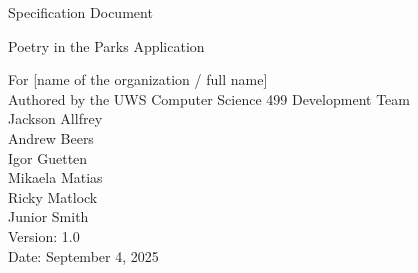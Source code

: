 \documentclass[reqno]{article}
\numberwithin{equation}{section}
\numberwithin{figure}{section}
\begin{document}
\begin{titlepage}
   \begin{center}
       \vspace*{1cm}
        Specification Document\\
        \vspace{0.50cm}
        
        Poetry in the Parks Application\\
        \vspace{0.50cm}
        
        For [name of the organization / full name]\\
        
        \vspace{0.50cm}
        Authored by the UWS Computer Science 499 Development Team \\
        
        \vspace{1.50cm}
        Jackson Allfrey\\ 
        \vspace{0.50cm}
        Andrew Beers\\ 
        \vspace{0.50cm}
        Igor Guetten \\
        \vspace{0.50cm}
        Mikaela Matias \\
        \vspace{0.50cm}
        Ricky Matlock \\
        \vspace{0.50cm}
        Junior Smith  \\

        \vspace{1cm}
        Version: 1.0 \\
        \vspace{0.5cm}
        Date: September 4, 2025 
            
   \end{center}
\end{titlepage}


\makeatletter
\def\@tocline#1#2#3#4#5#6#7{\relax
  \ifnum #1>\c@tocdepth %
  \else
    \par \addpenalty\@secpenalty \addvspace{#2}%
    \begingroup \hyphenpenalty\@M
    \@ifempty{#4}{%
      \@tempdima\csname r@tocindent\number#1\endcsname\relax
    }{%
      \@tempdima#4\relax
    }%
    \parindent\z@ \leftskip#3 \advance\leftskip\@tempdima
    \rightskip\@pnumwidth\parfillskip-\@pnumwidth
    #5\leavevmode\hskip-\@tempdima #6\relax
    \leaders\hbox{$\m@th
      \mkern \@dotsep mu\hbox{.}\mkern \@dotsep mu$}\hfill
    \hbox to\@pnumwidth{\@tocpagenum{#7}}\par
    \nobreak
    \endgroup
  \fi}
\makeatother



\tableofcontents
\setcounter{section}{0}







\end{document}
